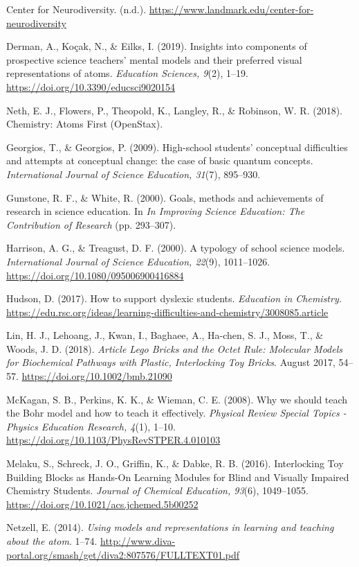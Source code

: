 \documentclass[11pt]{sig-alternate}
\begin{document}
\begin{large}
Center for Neurodiversity. (n.d.). \url{https://www.landmark.edu/center-for-neurodiversity}

Derman, A., Koçak, N., \& Eilks, I. (2019). Insights into components of prospective science teachers’ mental models and their preferred visual representations of atoms. \textit{Education Sciences, 9}(2), 1–19. \url{https://doi.org/10.3390/educsci9020154}

Neth, E. J., Flowers, P., Theopold, K., Langley, R., \& Robinson, W. R. (2018). Chemistry: Atoms First (OpenStax).

Georgios, T., \& Georgios, P. (2009). High-school students’ conceptual difficulties and attempts at conceptual change: the case of basic quantum concepts. \textit{International Journal of Science Education, 31}(7), 895–930.

Gunstone, R. F., \& White, R. (2000). Goals, methods and achievements of research in science education. In \textit{In Improving Science Education: The Contribution of Research} (pp. 293–307).

Harrison, A. G., \& Treagust, D. F. (2000). A typology of school science models. \textit{International Journal of Science Education, 22}(9), 1011–1026. \url{https://doi.org/10.1080/095006900416884}

Hudson, D. (2017). How to support dyslexic students. \textit{Education in Chemistry.} \url{https://edu.rsc.org/ideas/learning-difficulties-and-chemistry/3008085.article}

Lin, H. J., Lehoang, J., Kwan, I., Baghaee, A., Ha-chen, S. J., Moss, T., \& Woods, J. D. (2018). \textit{Article Lego Bricks and the Octet Rule: Molecular Models for Biochemical Pathways with Plastic, Interlocking Toy Bricks}. August 2017, 54–57. \url{https://doi.org/10.1002/bmb.21090}

McKagan, S. B., Perkins, K. K., \& Wieman, C. E. (2008). Why we should teach the Bohr model and how to teach it effectively. \textit{Physical Review Special Topics - Physics Education Research, 4}(1), 1–10. \url{https://doi.org/10.1103/PhysRevSTPER.4.010103}

Melaku, S., Schreck, J. O., Griffin, K., \& Dabke, R. B. (2016). Interlocking Toy Building Blocks as Hands-On Learning Modules for Blind and Visually Impaired Chemistry Students. \textit{Journal of Chemical Education, 93}(6), 1049–1055. \url{https://doi.org/10.1021/acs.jchemed.5b00252}

Netzell, E. (2014). \textit{Using models and representations in learning and teaching about the atom}. 1–74. \url{http://www.diva-portal.org/smash/get/diva2:807576/FULLTEXT01.pdf}


\end{large}
\end{document}
